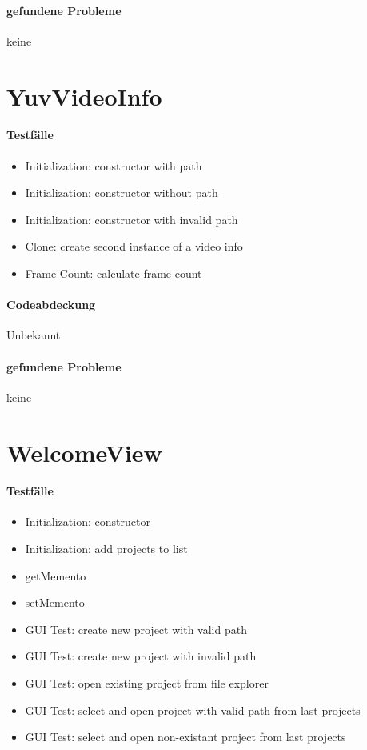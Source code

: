 \paragraph*{gefundene Probleme}
keine

\section{YuvVideoInfo}
\paragraph*{Testfälle}
\begin{itemize}
\item Initialization: constructor with path
\item Initialization: constructor without path
\item Initialization: constructor with invalid path
\item Clone: create second instance of a video info
\item Frame Count: calculate frame count
\end{itemize}

\paragraph*{Codeabdeckung}
Unbekannt

\paragraph*{gefundene Probleme}
keine

\section{WelcomeView}
\paragraph*{Testfälle}
\begin{itemize}
\item Initialization: constructor
\item Initialization: add projects to list
\item getMemento
\item setMemento
\item GUI Test: create new project with valid path
\item GUI Test: create new project with invalid path
\item GUI Test: open existing project from file explorer
\item GUI Test: select and open project with valid path from last projects
\item GUI Test: select and open non-existant project from last projects
\end{itemize}

